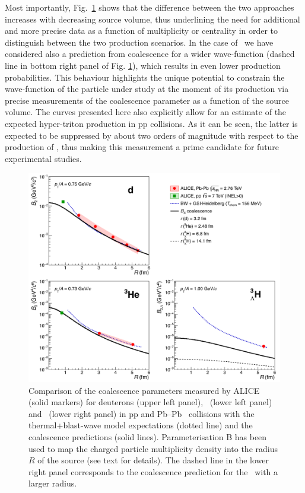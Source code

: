 Most importantly, Fig.~\ref{fig:CompareThermalAndCoalescence} shows that the difference between the two approaches increases with decreasing source volume, thus underlining the need for additional and more precise data as a function of multiplicity or centrality in order to distinguish between the two production scenarios. 
In the case of \hthreelambda~we have considered also a prediction from coalescence for a wider wave-function (dashed line in bottom right panel of Fig. \ref{fig:CompareThermalAndCoalescence}), which results in even lower production probabilities. This behaviour highlights the unique potential to constrain the wave-function of the particle under study at the moment of its production via precise measurements of the coalescence parameter as a function of the source volume. The curves presented here also explicitly allow for an estimate of the expected hyper-triton production in pp collisions. As it can be seen, the latter is expected to be suppressed by about two orders of magnitude with respect to the production of \hethree, thus making this measurement a prime candidate for future experimental studies.
 
\begin{figure}[htbp]
	\begin{center}
		\includegraphics[width=\textwidth]{../compareThermalAndCoalescence.png}
		\caption{Comparison of the coalescence parameters measured by ALICE (solid markers) for deuterons (upper left panel), \hethree\ (lower left panel) and \hthreelambda\ (lower right panel) in pp \cite{ALICE:nucleipp2017} and Pb--Pb~\cite{ALICE:deuteronppPbPb2015, Adam:2015yta} collisions with the  thermal+blast-wave model expectations (dotted line) and the coalescence predictions (solid lines). Parameterisation B has been used to map the charged particle multiplicity density into the radius $R$ of the source (see text for details). The dashed line in the lower right panel corresponds to the coalescence prediction for the \hthreelambda\ with a larger radius.}
		\label{fig:CompareThermalAndCoalescence}
	\end{center}
\end{figure}


